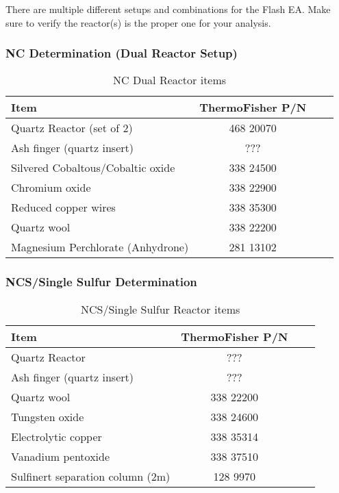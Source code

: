 \documentclass[12pt]{../SOP3}\usepackage[]{graphicx}\usepackage[]{color}
\begin{document}
\NP There are multiple different setups and combinations for the Flash EA. Make sure to verify the reactor(s) is the proper one for your analysis.

\subsubsection{NC Determination (Dual Reactor Setup)}

\begin{table}[h]
\label{NC Dual Reactor item list}
\caption{NC Dual Reactor items}
\centering
\begin{tabular}{lccc} \hline
Item    & ThermoFisher P/N \\ \hline\hline
Quartz Reactor (set of 2)   & 468 20070 \\ 
Ash finger (quartz insert)    & ??? \\ 
Silvered Cobaltous/Cobaltic oxide   & 338 24500 \\ 
Chromium oxide    & 338 22900 \\ 
Reduced copper wires    & 338 35300 \\ 
Quartz wool   & 338 22200 \\ 
Magnesium Perchlorate (Anhydrone)   & 281 13102 \\ 
\end{tabular}
\end{table}

\subsubsection{NCS/Single Sulfur Determination}

\begin{table}[h]
\label{NCS/Single Sulfur Reactor item list}
\caption{NCS/Single Sulfur Reactor items}
\centering
\begin{tabular}{lccc} \hline
Item    & ThermoFisher P/N \\ \hline\hline
Quartz Reactor   & ??? \\ 
Ash finger (quartz insert)    & ??? \\ 
Quartz wool   & 338 22200 \\ 
Tungsten oxide    & 338 24600 \\ 
Electrolytic copper   & 338 35314 \\ 
Vanadium pentoxide   & 338 37510 \\ 
Sulfinert separation column (2m)   & 128 9970 \\ 
\end{tabular}
\end{table}
\end{document}
